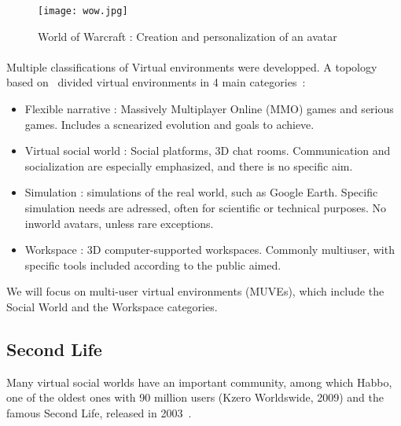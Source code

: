 \begin{figure}[h]
  \caption{World of Warcraft : Creation and personalization of an avatar~\cite{ref_VE_wow}}
  \centering
  \texttt{[image: wow.jpg]}
  \label{fig:VE_wow}
\end{figure}



\paragraph{}
Multiple classifications of Virtual environments were developped. A topology based on~\cite{mckeown2007taking} divided virtual environments in 4 main categories~\cite{warburton2009second}:
\begin{itemize}
\item Flexible narrative : Massively Multiplayer Online (MMO) games and serious games. Includes a scnearized evolution and goals to achieve.
\item Virtual social world : Social platforms, 3D chat rooms. Communication and socialization are especially emphasized, and there is no specific aim.
\item Simulation : simulations of the real world, such as Google Earth. Specific simulation needs are adressed, often for scientific or technical purposes. No inworld avatars, unless rare exceptions.
\item Workspace : 3D computer-supported workspaces. Commonly multiuser, with specific tools included according to the public aimed.

\end{itemize}

We will focus on multi-user virtual environments (MUVEs), which include the Social World and the Workspace categories. 


\subsection{Second Life}

Many virtual social worlds have an important community, among which Habbo, one of the oldest ones with 90 million users (Kzero Worldswide, 2009) and the famous Second Life, released in 2003~\cite{wang2009extending}. 
